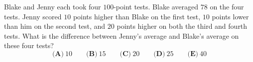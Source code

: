 Blake and Jenny each took four $100$-point tests. Blake averaged $78$ on the four tests. Jenny scored $10$ points higher than Blake on the first test, $10$ points lower than him on the second test, and $20$ points higher on both the third and fourth tests. What is the difference between Jenny's average and Blake's average on these four tests?
\[\textbf{(A)}\ 10\qquad\textbf{(B)}\ 15\qquad\textbf{(C)}\ 20\qquad\textbf{(D)}\ 25\qquad\textbf{(E)}\ 40\]
